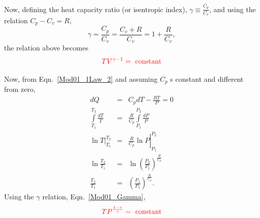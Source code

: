 \documentclass[12pts,a4paper,amsmath,amssymb,floatfix]{article}%
\newcommand{\frc}{\displaystyle\frac}
\newcommand{\red}{\textcolor{red}}
\begin{document}
\begin{enumerate}[i)]
           Now, defining the heat capacity ratio (or isentropic index), $\gamma\equiv\frc{C_{p}}{C_{v}}$, and using the relation $C_{p}-C_{v}=R$,
           \begin{equation}
              \gamma = \frc{C_{p}}{C_{v}} = \frc{C_{v}+R}{C_{v}} = 1 + \frc{R}{C_{v}},\label{Mod01_Gamma}
           \end{equation}
           the relation above becomes
           \begin{equation}
              \red{TV^{\gamma-1} = \text{ constant}}\label{Mod01_1Law_5}
           \end{equation}

           Now, from Eqn.~\ref{Mod01_1Law_2} and assuming $C_{p}$ s constant and different from zero,
           \begin{eqnarray}
             dQ &=& C_{p}dT - \frc{RT}{P} = 0 \nonumber \\
             \int\limits_{T_{1}}^{T_{2}}\frc{dT}{T} &=& \frc{R}{C_{p}}\int\limits_{P_{1}}^{P_{2}}\frc{dP}{P} \nonumber \\
             \left.\ln{T}\right|_{T_{1}}^{T_{2}} &=& \left.\frc{R}{C_{p}} \ln{P}\right|_{P_{1}}^{P_{2}} \nonumber \\
             \ln{\frc{T_{2}}{T_{1}}} &=& \ln{\left(\frc{P_{2}}{P_{1}}\right)^{\frac{R}{C_{p}}}} \nonumber \\
             \frc{T_{2}}{T_{1}} &=& \left(\frc{P_{2}}{P_{1}}\right)^{\frac{R}{C_{p}}}.\nonumber
           \end{eqnarray}
            Using the $\gamma$ relation, Eqn.~\ref{Mod01_Gamma},
           \begin{equation}
              \red{TP^{\frac{1-\gamma}{\gamma}} = \text{ constant}}\label{Mod01_1Law_6}
           \end{equation}


\end{enumerate}
\end{document}
